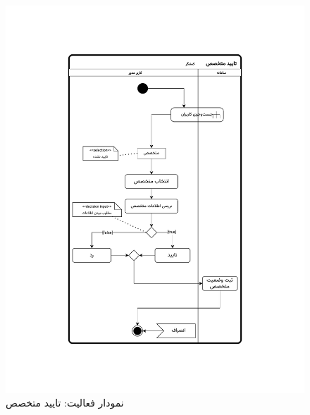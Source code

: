 \begin{figure}[ht!]
	\centering
	\includegraphics[scale=0.8, page=1]{figs/OOD-activity-confirmspec.pdf}
	\caption{نمودار فعالیت: تایید متخصص}
\end{figure}
\FloatBarrier
\newpage

